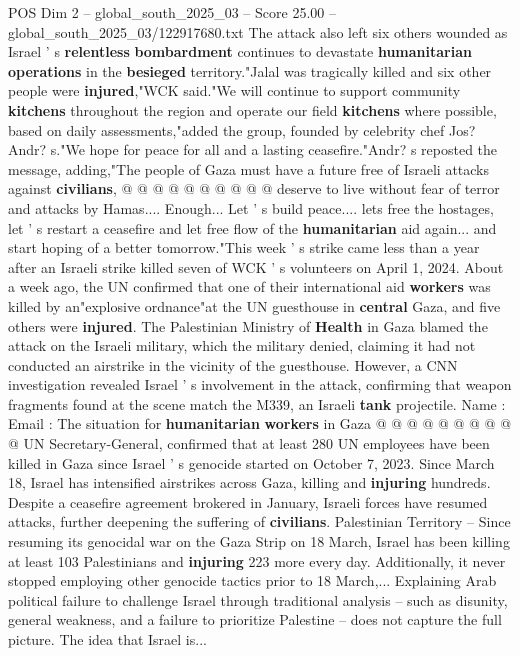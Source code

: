 \begin{textsample}{POS Dim 2 – global\_south\_2025\_03 – Score 25.00 – global\_south\_2025\_03/122917680.txt}
The attack also left six others wounded as Israel ' s \textbf{relentless} \textbf{bombardment} continues to devastate \textbf{humanitarian} \textbf{operations} in the \textbf{besieged} territory."Jalal was tragically killed and six other people were \textbf{injured},"WCK said."We will continue to support community \textbf{kitchens} throughout the region and operate our field \textbf{kitchens} where possible, based on daily assessments,"added the group, founded by celebrity chef Jos?
Andr? s."We hope for peace for all and a lasting ceasefire."Andr? s reposted the message, adding,"The people of Gaza must have a future free of Israeli attacks against \textbf{civilians}, @ @ @ @ @ @ @ @ @ @ deserve to live without fear of terror and attacks by Hamas....
Enough...
Let ' s build peace.... lets free the hostages, let ' s restart a ceasefire and let free flow of the \textbf{humanitarian} aid again... and start hoping of a better tomorrow."This week ' s strike came less than a year after an Israeli strike killed seven of WCK ' s volunteers on April 1, 2024.
About a week ago, the UN confirmed that one of their international aid \textbf{workers} was killed by an"explosive ordnance"at the UN guesthouse in \textbf{central} Gaza, and five others were \textbf{injured}.
The Palestinian Ministry of \textbf{Health} in Gaza blamed the attack on the Israeli military, which the military denied, claiming it had not conducted an airstrike in the vicinity of the guesthouse.
However, a CNN investigation revealed Israel ' s involvement in the attack, confirming that weapon fragments found at the scene match the M339, an Israeli \textbf{tank} projectile.
Name : Email : The situation for \textbf{humanitarian} \textbf{workers} in Gaza @ @ @ @ @ @ @ @ @ @ UN Secretary-General, confirmed that at least 280 UN employees have been killed in Gaza since Israel ' s genocide started on October 7, 2023.
Since March 18, Israel has intensified airstrikes across Gaza, killing and \textbf{injuring} hundreds.
Despite a ceasefire agreement brokered in January, Israeli forces have resumed attacks, further deepening the suffering of \textbf{civilians}.
Palestinian Territory -- Since resuming its genocidal war on the Gaza Strip on 18 March, Israel has been killing at least 103 Palestinians and \textbf{injuring} 223 more every day.
Additionally, it never stopped employing other genocide tactics prior to 18 March,...
Explaining Arab political failure to challenge Israel through traditional analysis -- such as disunity, general weakness, and a failure to prioritize Palestine -- does not capture the full picture.
The idea that Israel is...

\end{textsample}

